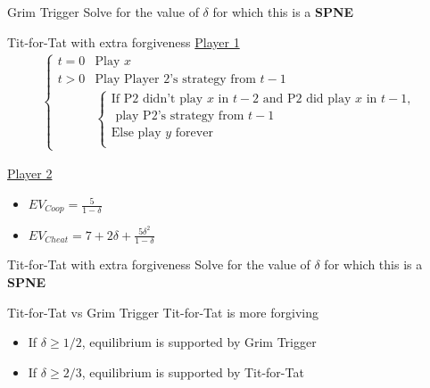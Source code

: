 \begin{frame}{Grim Trigger}
  Solve for the value of $\delta$ for which this is a \textbf{SPNE}
  \vspace{50mm}
\end{frame}

\begin{frame}{Tit-for-Tat with extra forgiveness}
  \underline{Player 1} 
  \begin{align*}
    \begin{cases}
      t = 0 & \text{Play } x  \\ 
      t > 0 & \text{Play Player 2's strategy from } t-1 \\
       & 
      \begin{cases}
        \text{If P2 didn't play } x \text{ in } t-2 \text{ and P2 did play } x \text{ in } t-1, \\ 
        \text{ play P2's strategy from } t-1 \\ 
        \text{Else play } y \text{ forever} \\
      \end{cases}
    \end{cases} 
  \end{align*}

  \underline{Player 2}
  \begin{itemize}
    \item $EV_{Coop} = \frac{5}{1-\delta}$ 
    \item $EV_{Cheat} = 7 + 2\delta + \frac{5\delta^2}{1-\delta}$
  \end{itemize}
\end{frame}

\begin{frame}{Tit-for-Tat with extra forgiveness}
  Solve for the value of $\delta$ for which this is a \textbf{SPNE}
  \vspace{50mm}
\end{frame}

\begin{frame}{Tit-for-Tat vs Grim Trigger}
  Tit-for-Tat is more forgiving
  \begin{itemize}
    \item If $\delta \geq 1/2$, equilibrium is supported by Grim Trigger 
    \item If $\delta \geq 2/3$, equilibrium is supported by Tit-for-Tat
  \end{itemize}
\end{frame}

